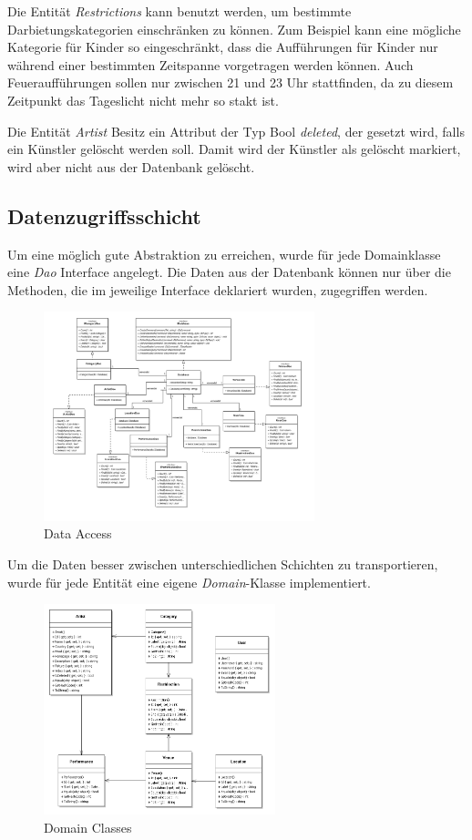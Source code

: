 \documentclass[12pt, a4paper]{article}
\begin{document}
Die Entität \textit{Restrictions} kann benutzt werden, um bestimmte Darbietungskategorien einschränken zu können. Zum Beispiel kann eine mögliche Kategorie für Kinder so eingeschränkt, dass die Aufführungen für Kinder nur während einer bestimmten Zeitspanne vorgetragen werden können. Auch Feueraufführungen sollen nur zwischen 21 und 23 Uhr stattfinden, da zu diesem Zeitpunkt das Tageslicht nicht mehr so stakt ist. 

Die Entität \textit{Artist} Besitz ein Attribut der Typ Bool \textit{deleted}, der gesetzt wird, falls ein Künstler gelöscht werden soll. Damit wird der Künstler als gelöscht markiert, wird aber nicht aus der Datenbank gelöscht.

\subsection{Datenzugriffsschicht}

Um eine möglich gute Abstraktion zu erreichen, wurde für jede Domainklasse eine \textit{Dao} Interface angelegt. Die Daten aus der Datenbank können nur über die Methoden, die im jeweilige Interface deklariert wurden, zugegriffen werden.

\begin{figure}[h] 	
	\centering
		\includegraphics[width=0.7\textwidth]{Dao.png}
	\caption{Data Access}
\end{figure}

Um die Daten besser zwischen unterschiedlichen Schichten zu transportieren, wurde für jede Entität eine eigene \textit{Domain}-Klasse implementiert.

\begin{figure}[h] 	
	\centering
		\includegraphics[width=0.6\textwidth]{DomainClasses.png}
	\caption{Domain Classes}
\end{figure}
\end{document}
